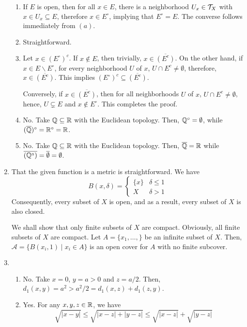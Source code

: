 \begin{enumerate}
\begin{enumerate}[label=(\alph*)]
    \item If $E$ is open, then for all $x\in E$, there is a neighborhood $U_x\in\mathcal{T}_X$ with $x\in U_x\subseteq E$, therefore $x\in E^\circ$, implying that $E^\circ = E$. The converse follows immediately from $(a)$.

    \item Straightforward.

    \item  Let $x\in (E^\circ)^c$. If $x\notin E$, then trivially, $x\in \overline{(E^c)}$. On the other hand, if $x\in E\backslash E^\circ$, for every neighborhood $U$ of $x$, $U\cap E^c\ne\emptyset$, therefore, $x\in\overline{(E^c)}$. This implies $(E^\circ)^c\subseteq\overline{(E^c)}$.
    
    Conversely, if $x\in\overline{(E^c)}$, then for all neighborhoods $U$ of $x$, $U\cap E^c\ne\emptyset$, hence, $U\subsetneq E$ and $x\notin E^\circ$. This completes the proof.

    \item No. Take $\mathbb{Q}\subseteq\mathbb{R}$ with the Euclidean topology. Then, $\mathbb{Q}^\circ = \emptyset$, while $(\overline{\mathbb{Q}})^\circ = \mathbb{R}^\circ = \mathbb{R}$.

    \item No. Take $\mathbb{Q}\subseteq\mathbb{R}$ with the Euclidean topology. Then, $\overline{\mathbb{Q}} = \mathbb{R}$ while $\overline{(\mathbb{Q}^\circ)} = \overline{\emptyset} = \emptyset$.
\end{enumerate}

\item That the given function is a metric is straightforward. We have 
\begin{equation*}
    B(x,\delta) = 
    \begin{cases}
        \{x\} & \delta\le 1\\
        X & \delta > 1
    \end{cases}
\end{equation*}
Consequently, every subset of $X$ is open, and as a result, every subset of $X$ is also closed. 

We shall show that only finite subsets of $X$ are compact. Obviously, all finite subsets of $X$ are compact. Let $A = \{x_1,\ldots,\}$ be an infinite subset of $X$. Then, $\mathscr{A} = \{B(x_i, 1)\mid x_i\in A\}$ is an open cover for $A$ with no finite subcover.

\item 
\begin{enumerate}[label=(\roman*)]
    \item No. Take $x = 0$, $y = a > 0$ and $z = a/2$. Then, $d_1(x,y) = a^2 > a^2/2 = d_1(x,z) + d_1(z,y)$.
    \item Yes. For any $x,y,z\in\mathbb{R}$, we have 
    \begin{equation*}
        \sqrt{|x - y|} \le\sqrt{|x - z| + |y - z|}\le\sqrt{|x - z|} + \sqrt{|y - z|}
    \end{equation*}


\end{enumerate}
\end{enumerate}
